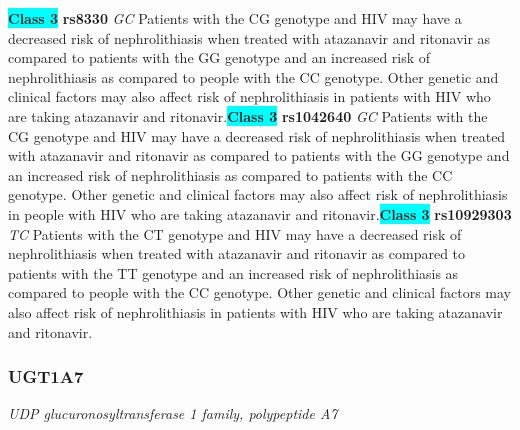 \documentclass{report}
\begin{document}
\textbf{\colorbox{cyan} {Class 3}} \textbf{ rs8330 } \textit{ GC }
Patients with the CG genotype and HIV may have a decreased risk of nephrolithiasis when treated with atazanavir and ritonavir as compared to patients with the GG genotype and an increased risk of nephrolithiasis as compared to people with the CC genotype. Other genetic and clinical factors may also affect risk of nephrolithiasis in patients with HIV who are taking atazanavir and ritonavir.\newline\textbf{\colorbox{cyan} {Class 3}} \textbf{ rs1042640 } \textit{ GC }
Patients with the CG genotype and HIV may have a decreased risk of nephrolithiasis when treated with atazanavir and ritonavir as compared to patients with the GG genotype and an increased risk of nephrolithiasis as compared to patients with the CC genotype. Other genetic and clinical factors may also affect risk of nephrolithiasis in people with HIV who are taking atazanavir and ritonavir.\newline\textbf{\colorbox{cyan} {Class 3}} \textbf{ rs10929303 } \textit{ TC }
Patients with the CT genotype and HIV may have a decreased risk of nephrolithiasis when treated with atazanavir and ritonavir as compared to patients with the TT genotype and an increased risk of nephrolithiasis as compared to people with the CC genotype. Other genetic and clinical factors may also affect risk of nephrolithiasis in patients with HIV who are taking atazanavir and ritonavir. \newline\subsubsection{ UGT1A7 }
\textit{ UDP glucuronosyltransferase 1 family, polypeptide A7 }
\end{document}
